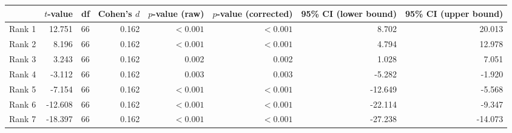 \begin{tabular}{lrrrrrrr}
\toprule
 & $t$-value & df & Cohen's $d$ & $p$-value (raw) & $p$-value (corrected) & 95\% CI (lower bound) & 95\% CI (upper bound) \\
\midrule
\rowcolor[HTML]{fffee3} Rank 1 & 12.751 & 66 & 0.162 & $< 0.001$ & $< 0.001$ & 8.702 & 20.013 \\
\rowcolor[HTML]{fffee3} Rank 2 & 8.196 & 66 & 0.162 & $< 0.001$ & $< 0.001$ & 4.794 & 12.978 \\
\rowcolor[HTML]{fffee3} Rank 3 & 3.243 & 66 & 0.162 & 0.002 & 0.002 & 1.028 & 7.051 \\
\rowcolor[HTML]{fffee3} Rank 4 & -3.112 & 66 & 0.162 & 0.003 & 0.003 & -5.282 & -1.920 \\
\rowcolor[HTML]{fffee3} Rank 5 & -7.154 & 66 & 0.162 & $< 0.001$ & $< 0.001$ & -12.649 & -5.568 \\
\rowcolor[HTML]{fffee3} Rank 6 & -12.608 & 66 & 0.162 & $< 0.001$ & $< 0.001$ & -22.114 & -9.347 \\
\rowcolor[HTML]{fffee3} Rank 7 & -18.397 & 66 & 0.162 & $< 0.001$ & $< 0.001$ & -27.238 & -14.073 \\
\bottomrule
\end{tabular}